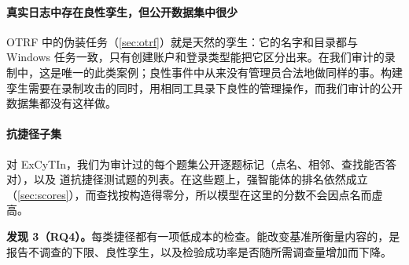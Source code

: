 \paragraph{真实日志中存在良性孪生，但公开数据集中很少} OTRF 中的伪装任务（\cref{sec:otrf}）就是天然的孪生：它的名字和目录都与 Windows 任务一致，只有创建账户和登录类型能把它区分出来。在我们审计的录制中，这是唯一的此类案例；良性事件中从来没有管理员合法地做同样的事。构建孪生需要在录制攻击的同时，用相同工具录下良性的管理操作，而我们审计的公开数据集都没有这样做。

\paragraph{抗捷径子集} 对 ExCyTIn，我们为审计过的每个题集公开逐题标记（点名、相邻、查找能否答对），以及 \lgResN{} 道抗捷径测试题的列表。在这些题上，强智能体的排名依然成立（\cref{sec:scores}），而查找按构造得零分，所以模型在这里的分数不会因点名而虚高。

\smallskip\noindent\textbf{发现 3（RQ4）。}每类捷径都有一项低成本的检查。能改变基准所衡量内容的，是报告不调查的下限、良性孪生，以及检验成功率是否随所需调查量增加而下降。
